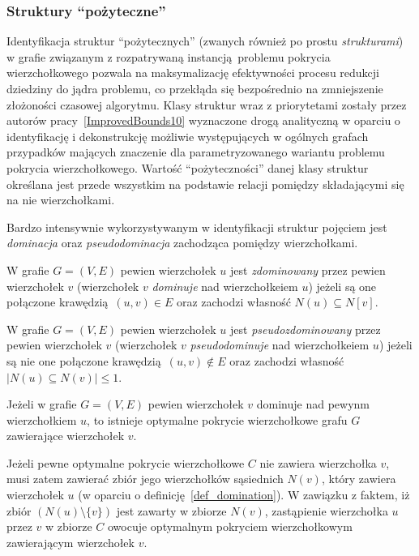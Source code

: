 \subsubsection{\textbf{Struktury ``pożyteczne''}}
\label{sss_ckx_structures}
\par{
  Identyfikacja struktur ``pożytecznych'' (zwanych również po prostu \emph{strukturami}) w grafie związanym z rozpatrywaną instancją problemu pokrycia wierzchołkowego pozwala na maksymalizację efektywności procesu redukcji dziedziny do jądra problemu, co przekłąda się bezpośrednio na zmniejszenie złożoności czasowej algorytmu. Klasy struktur wraz z priorytetami zostały przez autorów pracy~\ref{ImprovedBounds10} wyznaczone drogą analityczną w oparciu o identyfikację i dekonstrukcję możliwie występujących w ogólnych grafach przypadków mających znaczenie dla parametryzowanego wariantu problemu pokrycia wierzchołkowego.
  Wartość ``pożyteczności'' danej klasy struktur określana jest przede wszystkim na podstawie relacji pomiędzy składającymi się na nie wierzchołkami.
}
\par{
  Bardzo intensywnie wykorzystywanym w identyfikacji struktur pojęciem jest \emph{dominacja} oraz \emph{pseudodominacja} zachodząca pomiędzy wierzchołkami.
  \begin{definition}
    W grafie $G=(V, E)$ pewien wierzchołek $u$ jest \emph{zdominowany} przez pewien wierzchołek $v$ (wierzchołek $v$ \emph{dominuje} nad wierzchołkeiem $u$) jeżeli są one połączone krawędzią $(u, v) \in E$ oraz zachodzi własność $N(u) \subseteq N[v]$.
  \end{definition}
  \begin{definition}
    W grafie $G=(V, E)$ pewien wierzchołek $u$ jest \emph{pseudozdominowany} przez pewien wierzchołek $v$ (wierzchołek $v$ \emph{pseudodominuje} nad wierzchołkeiem $u$) jeżeli są nie one połączone krawędzią $(u, v) \notin E$ oraz zachodzi własność $|N(u) \subseteq N(v)| \leq 1$.
  \end{definition}
  \begin{theorem}
      Jeżeli w grafie $G=(V, E)$ pewien wierzchołek $v$ dominuje nad pewynm wierzchołkiem $u$, to istnieje optymalne pokrycie wierzchołkowe grafu $G$ zawierające wierzchołek $v$.
  \end{theorem}
  \begin{bproof}
    Jeżeli pewne optymalne pokrycie wierzchołkowe $C$ nie zawiera wierzchołka $v$, musi zatem zawierać zbiór jego wierzchołków sąsiednich $N(v)$, który zawiera wierzchołek $u$ (w oparciu o definicję~\ref{def_domination}).
    W zawiązku z faktem, iż zbiór $(N(u) \setminus \{v\})$ jest zawarty w zbiorze $N(v)$, zastąpienie wierzchołka $u$ przez $v$ w zbiorze $C$ owocuje optymalnym pokryciem wierzchołkowym zawierającym wierzchołek $v$.
  \end{bproof}
}